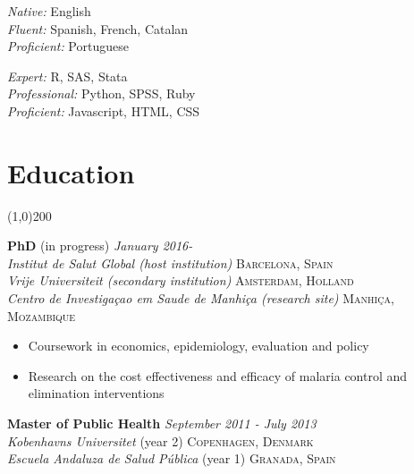 \documentclass[11pt]{article}
\begin{document}
\begin{multicols}{2}

\noindent \emph{Native:} English\\
\noindent \emph{Fluent:} Spanish, French, Catalan\\
\noindent \emph{Proficient:} Portuguese

\vfill
\columnbreak


\noindent \emph{Expert:} R, SAS, Stata\\
\noindent \emph{Professional:} Python, SPSS, Ruby\\
\noindent \emph{Proficient:} Javascript, HTML, CSS


\end{multicols}



\section*{Education} %
\vspace{-7mm}
\line(1,0){200}
\vspace{2mm}

\noindent \textbf{PhD} (in progress) \hfill \emph{January 2016-}\\
\noindent \emph{Institut de Salut Global (host institution)} \hfill \textsc{Barcelona, Spain} \\
\noindent \emph{Vrije Universiteit (secondary institution)} \hfill \textsc{Amsterdam, Holland} \\
\noindent \emph{Centro de Investigaçao em Saude de Manhiça (research site)} \hfill \textsc{Manhiça, Mozambique}

\vspace{-2mm}
\begin{itemize}\itemsep0pt \parskip0pt 
\item Coursework in economics, epidemiology, evaluation and policy
\item Research on the cost effectiveness and efficacy of malaria control and elimination interventions
\end{itemize}
\noindent \textbf{Master of Public Health} \hfill \emph{September 2011 - July 2013} \\
\noindent \emph{Kobenhavns Universitet} (year 2) \hfill \textsc{Copenhagen, Denmark} \\
\noindent \emph{Escuela Andaluza de Salud Pública} (year 1) \hfill \textsc{Granada, Spain}
\end{document}

